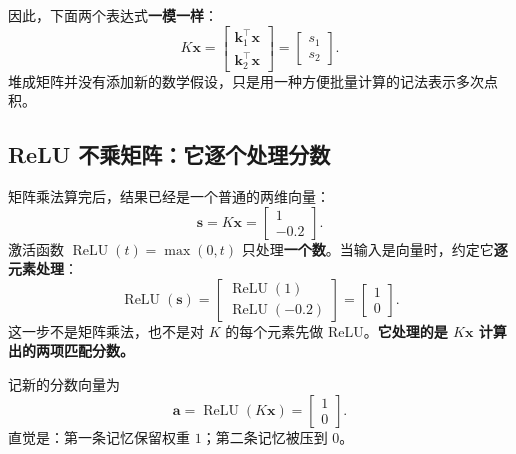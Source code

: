 \documentclass[11pt,a4paper,UTF8]{ctexart}
\numberwithin{equation}{section}
\newcommand{\vect}[1]{\boldsymbol{#1}}
\newcommand{\relu}{\operatorname{ReLU}}
\begin{document}
因此，下面两个表达式\textbf{一模一样}：
\[
K\vect{x}
=
\begin{bmatrix}\vect{k}_1^\top\vect{x}\\\vect{k}_2^\top\vect{x}\end{bmatrix}
=
\begin{bmatrix}s_1\\s_2\end{bmatrix}.
\]
堆成矩阵并没有添加新的数学假设，只是用一种方便批量计算的记法表示多次点积。

\begin{center}
\end{center}

\subsection{ReLU 不乘矩阵：它逐个处理分数}

矩阵乘法算完后，结果已经是一个普通的两维向量：
\[
\vect{s}=K\vect{x}=\begin{bmatrix}1\\-0.2\end{bmatrix}.
\]
激活函数 $\relu(t)=\max(0,t)$ 只处理\textbf{一个数}。当输入是向量时，约定它\textbf{逐元素处理}：
\begin{equation}
\relu(\vect{s})
=\begin{bmatrix}\relu(1)\\\relu(-0.2)\end{bmatrix}
=\boxed{\begin{bmatrix}1\\0\end{bmatrix}}.
\end{equation}
这一步不是矩阵乘法，也不是对 $K$ 的每个元素先做 ReLU。\textbf{它处理的是 $K\vect{x}$ 计算出的两项匹配分数。}

记新的分数向量为
\[
\vect{a}=\relu(K\vect{x})=\begin{bmatrix}1\\0\end{bmatrix}.
\]
直觉是：第一条记忆保留权重 $1$；第二条记忆被压到 $0$。
\end{document}
